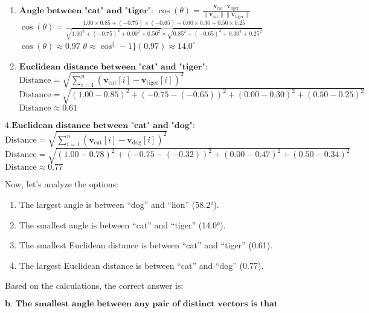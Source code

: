 \documentclass[11pt]{article}
\begin{document}
\begin{enumerate}
\def\labelenumi{\arabic{enumi}.}
\setcounter{enumi}{1}
\item
  $\textbf{Angle between "cat" and "tiger":}$ $ \cos(\theta) =
  \frac{{\mathbf{v}_{\text{cat}} \cdot \mathbf{v}_{\text{tiger}}}}{{\|\mathbf{v}_{\text{cat}}\| \|\mathbf{v}_{\text{tiger}}\|}}
  $ $ \cos(\theta) =
  \frac{{1.00 \times 0.85 + (-0.75) \times (-0.65) + 0.00 \times 0.30 + 0.50 \times 0.25}}{{\sqrt{1.00^2 + (-0.75)^2 + 0.00^2 + 0.50^2} \times \sqrt{0.85^2 + (-0.65)^2 + 0.30^2 + 0.25^2}}}
  $ $ \cos(\theta) \approx 0.97 $ $
  \theta \approx \cos^\{-1\}(0.97) \approx 14.0^\circ $
\item
  $\textbf{Euclidean distance between "cat" and "tiger":}$ $
  \text{Distance} =
  \sqrt{\sum_{i=1}^{n} (\mathbf{v}_{\text{cat}}[i] - \mathbf{v}_{\text{tiger}}[i])^2}
  $ $ \text{Distance} =
  \sqrt{(1.00 - 0.85)^2 + (-0.75 - (-0.65))^2 + (0.00 - 0.30)^2 + (0.50 - 0.25)^2}
  $ $ \text{Distance} \approx 0.61 $
\end{enumerate}

4.$ \textbf{Euclidean distance between "cat" and "dog":}$ $
\text{Distance} =
\sqrt{\sum_{i=1}^{n} (\mathbf{v}_{\text{cat}}[i] - \mathbf{v}_{\text{dog}}[i])^2}
$ $ \text{Distance} =
\sqrt{(1.00 - 0.78)^2 + (-0.75 - (-0.32))^2 + (0.00 - 0.47)^2 + (0.50 - 0.34)^2}
$ $ \text{Distance} \approx 0.77 $

Now, let's analyze the options:

\begin{enumerate}
\def\labelenumi{\alph{enumi}.}
\item
  The largest angle is between ``dog'' and ``lion'' (58.2°).
\item
  The smallest angle is between ``cat'' and ``tiger'' (14.0°).
\item
  The smallest Euclidean distance is between ``cat'' and ``tiger''
  (0.61).
\item
  The largest Euclidean distance is between ``cat'' and ``dog'' (0.77).
\end{enumerate}

Based on the calculations, the correct answer is:

$\textbf{b. The smallest angle between any pair of distinct vectors is that between the "cat" and the "tiger".}$
\end{document}
